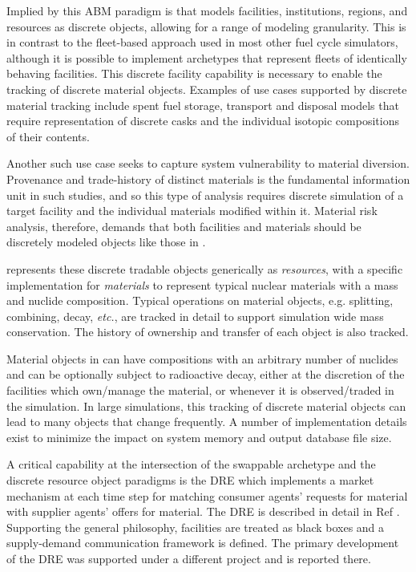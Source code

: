 Implied by this \gls{ABM} paradigm is that \Cyclus models facilities,
institutions, regions, and resources as discrete objects, allowing for a range
of modeling granularity.  This is in contrast to the fleet-based approach used
in most other fuel cycle simulators, although it is possible to implement
\Cyclus archetypes that represent fleets of identically behaving
facilities.  This discrete facility capability is
necessary to enable the tracking of discrete material objects.  Examples of
use cases supported by discrete material tracking include spent fuel storage,
transport and disposal models that require representation of discrete casks
and the individual isotopic compositions of their contents.

Another such use case seeks to capture system vulnerability to material
diversion. Provenance and trade-history of distinct materials is the
fundamental information unit in such studies, and so this type of analysis
requires discrete simulation of a target facility and the individual materials
modified within it.  Material risk analysis, therefore, demands that both
facilities and materials should be discretely modeled objects like those in
\Cyclus.

\Cyclus represents these discrete tradable objects generically as
\textit{resources}, with a specific implementation for \textit{materials} to
represent typical nuclear materials with a mass and nuclide composition.
Typical operations on material objects, e.g. splitting, combining, decay,
\emph{etc.}, are tracked in detail to support simulation wide mass
conservation.  The history of ownership and transfer of each object is also
tracked.

Material objects in \Cyclus can have compositions with an arbitrary number of
nuclides and can be optionally subject to radioactive decay, either at the
discretion of the facilities which own/manage the material, or whenever it is
observed/traded in the simulation.  In large simulations, this tracking of
discrete material objects can lead to many objects that change frequently.  A
number of implementation details exist to minimize the impact on system memory
and output database file size.

A critical capability at the intersection of the swappable archetype and the
discrete resource object paradigms is the \gls{DRE} which implements a market
mechanism at each time step for matching consumer agents' requests for
material with supplier agents' offers for material.  The \gls{DRE} is
described in detail in Ref .  Supporting the
general \Cyclus philosophy, facilities are treated as black boxes and a
supply-demand communication framework is defined.  The primary development of
the \gls{DRE} was supported under a different project and is reported
there.

